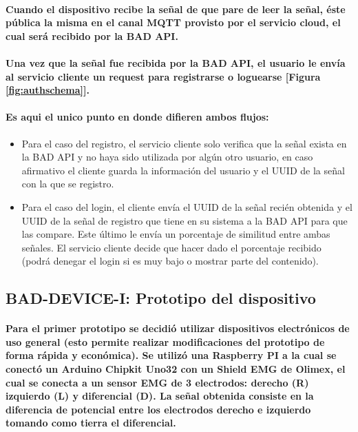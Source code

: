 \documentclass{article}
\begin{document}
\paragraph{
Cuando el dispositivo recibe la señal de que pare de leer la señal, éste pública la misma en el canal MQTT provisto por el servicio cloud, el cual será recibido por la BAD API.
}
\paragraph{
Una vez que la señal fue recibida por la BAD API, el usuario le envía al servicio cliente un request para registrarse o loguearse [Figura \ref{fig:authschema}].
}
\paragraph{
Es aqui el unico punto en donde difieren ambos flujos:
}
\begin{itemize}
    \item Para el caso del registro, el servicio cliente solo verifica que la señal exista en la BAD API y no haya sido utilizada por algún otro usuario, en caso afirmativo el cliente guarda la información del usuario y el UUID de la señal con la que se registro.
    \item Para el caso del login, el cliente envía el UUID de la señal recién obtenida y el UUID de la señal de registro que tiene en su sistema a la BAD API para que las compare. Este último le envía un porcentaje de similitud entre ambas señales. El servicio cliente decide que hacer dado el porcentaje recibido (podrá denegar el login si es muy bajo o mostrar parte del contenido).
\end{itemize}


\subsection{BAD-DEVICE-I: Prototipo del dispositivo}
\paragraph{
Para el primer prototipo se decidió utilizar dispositivos electrónicos de uso general (esto permite realizar modificaciones del prototipo de forma rápida y económica). Se utilizó una Raspberry PI a la cual se conectó un Arduino Chipkit Uno32 con un Shield EMG de Olimex, el cual se conecta a un sensor EMG de 3 electrodos: derecho (R) izquierdo (L) y diferencial (D). La señal obtenida consiste en la diferencia de potencial entre los electrodos derecho e izquierdo tomando como tierra el diferencial.
}
\end{document}
